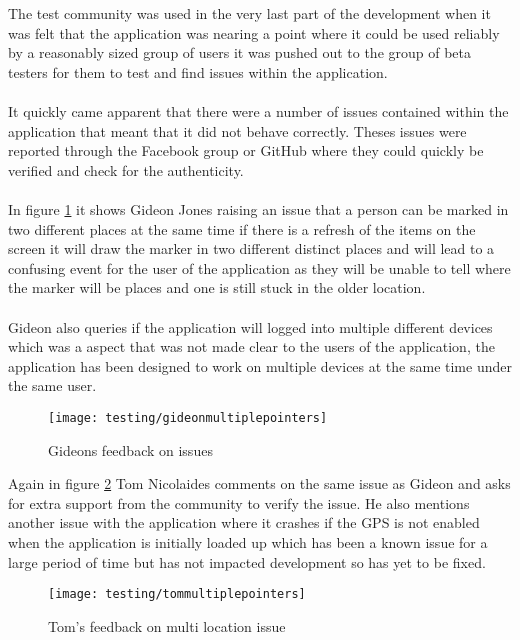 \noindent
The test community was used in the very last part of the development when it was felt that the application was nearing a point where it could be used reliably by a reasonably sized group of users it was pushed out to the group of beta testers for them to test and find issues within the application.\\
\\
It quickly came apparent that there were a number of issues contained within the application that meant that it did not behave correctly. Theses issues were reported through the Facebook group or GitHub where they could quickly be verified and check for the authenticity.\\
\\
In figure \ref{fig:gideons_feedback} it shows Gideon Jones raising an issue that a person can be marked in two different places at the same time if there is a refresh of the items on the screen it will draw the marker in two different distinct places and will lead to a confusing event for the user of the application as they will be unable to tell where the marker will be places and one is still stuck in the older location.\\
\\
Gideon also queries if the application will logged into multiple different devices which was a aspect that was not made clear to the users of the application, the application has been designed to work on multiple devices at the same time under the same user.

\begin{figure}[H]
    \centering
    \texttt{[image: testing/gideonmultiplepointers]}
    \caption{Gideons feedback on issues}
    \label{fig:gideons_feedback}
\end{figure} 

\noindent
Again in figure \ref{fig:toms_feedback} Tom Nicolaides comments on the same issue as Gideon and asks for extra support from the community to verify the issue. He also mentions another issue with the application where it crashes if the GPS is not enabled when the application is initially loaded up which has been a known issue for a large period of time but has not impacted development so has yet to be fixed.

\begin{figure}[H]
    \centering
    \texttt{[image: testing/tommultiplepointers]}
    \caption{Tom's feedback on multi location issue}
    \label{fig:toms_feedback}
\end{figure}

